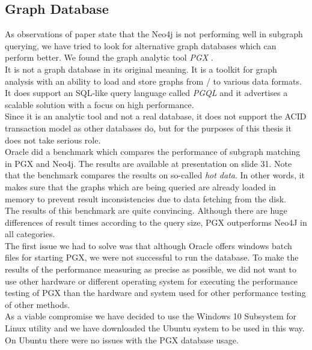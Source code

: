 {\subsection{Graph Database}

As observations of paper \cite{Hoksza} state that the Neo4j is not performing well in subgraph querying, we have tried to look for alternative graph databases which can perform better. We found the graph analytic tool \textit{PGX} \cite{pgx}.\\

It is not a graph database in its original meaning. It is a toolkit for graph analysis with an ability to load and store graphs from / to various data formats. It does support an SQL-like query language called \textit{PGQL} \cite{pgql} and it advertises a scalable solution with a focus on high performance.\\

Since it is an analytic tool and not a real database, it does not support the ACID transaction model as other databases do, but for the purposes of this thesis it does not take serious role.\\

Oracle did a benchmark which compares the performance of subgraph matching in PGX and Neo4j. The results are available at presentation \cite{pgx-neo4j} on slide 31. Note that the benchmark compares the results on so-called \textit{hot data}. In other words, it makes sure that the graphs which are being queried are already loaded in memory to prevent result inconsistencies due to data fetching from the disk.\\

The results of this benchmark are quite convincing. Although there are huge differences of result times according to the query size, PGX outperforms Neo4J in all categories.\\

The first issue we had to solve was that although Oracle offers windows batch files for starting PGX, we were not successful to run the database. To make the results of the performance measuring as precise as possible, we did not want to use other hardware or different operating system for executing the performance testing of PGX than the hardware and system used for other performance testing of other methods.\\

As a viable compromise we have decided to use the Windows 10 Subsystem for Linux utility \cite{wsl} and we have downloaded the Ubuntu system to be used in this way. On Ubuntu there were no issues with the PGX database usage.\\

}
